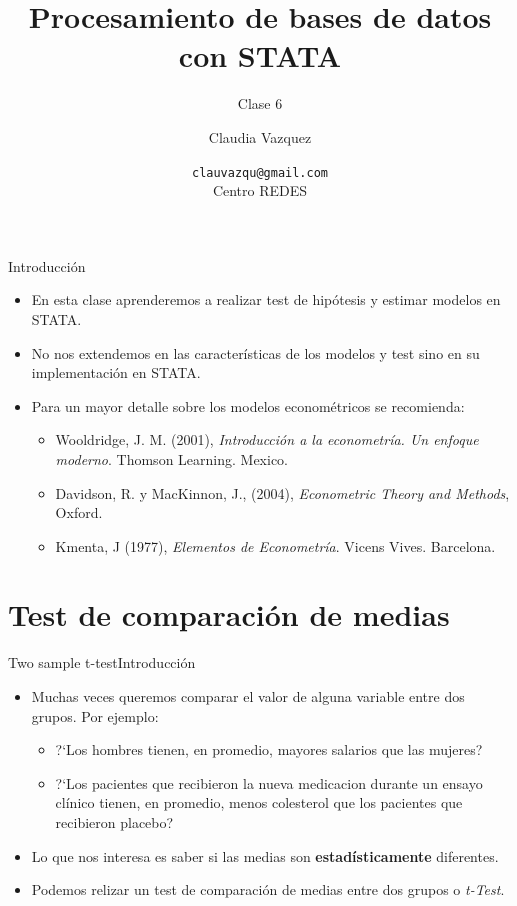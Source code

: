 \documentclass{beamer}
\title[Clase 6]{Procesamiento de bases de datos con STATA}
\subtitle{Clase 6}
\author{Claudia Vazquez}
\date[]{\texttt{clauvazqu@gmail.com}\\Centro REDES}
\begin{document}
\begin{frame}
  \titlepage
\end{frame}

\begin{frame}
\tableofcontents
\end{frame}

\begin{frame}{Introducción}
\begin{itemize}
\item En esta clase aprenderemos a realizar test de hipótesis y estimar modelos en STATA.
\item No nos extendemos en las características de los modelos y test sino en su implementación en STATA.
\item Para un mayor detalle sobre los modelos econométricos se recomienda:
\begin{itemize}
\item Wooldridge, J. M. (2001), \textit{Introducción a la econometría. Un enfoque moderno}. Thomson Learning. Mexico.	
\item Davidson, R. y MacKinnon, J., (2004), \textit{Econometric Theory and Methods}, Oxford.
\item Kmenta, J (1977), \textit{Elementos de Econometría}. Vicens Vives. Barcelona. 
\end{itemize}
\end{itemize}
\end{frame}

\section{Test de comparación de medias}

\begin{frame}{Two sample t-test}{Introducción}
\begin{itemize}
\item Muchas veces queremos comparar el valor de alguna variable entre dos grupos. Por ejemplo: 
\begin{itemize}
\item ?`Los hombres tienen, en promedio, mayores salarios que las mujeres? 
\item ?`Los pacientes que recibieron la nueva medicacion durante un ensayo clínico tienen, en promedio, menos colesterol que los pacientes que recibieron placebo?
\end{itemize}
\item Lo que nos interesa es saber si las medias son \textbf{estadísticamente} diferentes.
\item Podemos relizar un test de comparación de medias entre dos grupos o \textit{t-Test}.
\end{itemize}
\end{frame}
\end{document}
